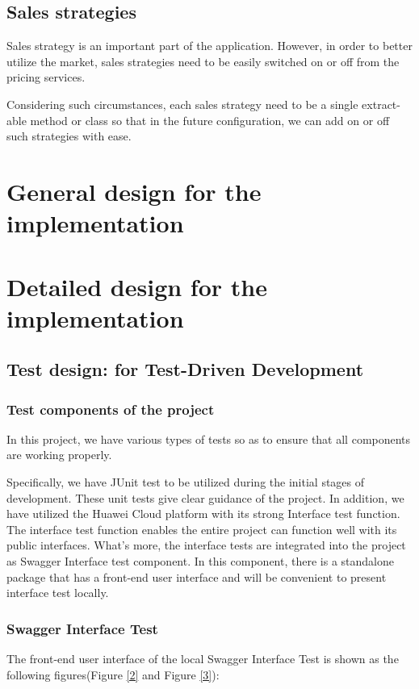\documentclass[a4paper]{report}
\begin{document}
\section{Sales strategies}
Sales strategy is an important part of the application. However, in order to better utilize the market, sales strategies need to be easily switched on or off from the pricing services.
\par
Considering such circumstances, each sales strategy need to be a single extract-able method or class so that in the future configuration, we can add on or off such strategies with ease.


\chapter{General design for the implementation}



\chapter{Detailed design for the implementation}
\section{Test design: for Test-Driven Development}
\subsection{Test components of the project}
In this project, we have various types of tests so as to ensure that all components are working properly.
\par
Specifically, we have JUnit test to be utilized during the initial stages of development. These unit tests give clear guidance of the project.
In addition, we have utilized the Huawei Cloud platform with its strong Interface test function. The interface test function enables the entire project can function well with its public interfaces. What's more, the interface tests are integrated into the project as Swagger Interface test component. In this component, there is a standalone package that has a front-end user interface and will be convenient to present interface test locally.
\subsection{Swagger Interface Test}
The front-end user interface of the local Swagger Interface Test is shown as the following figures(Figure \ref{2} and Figure \ref{3}):
\end{document}
